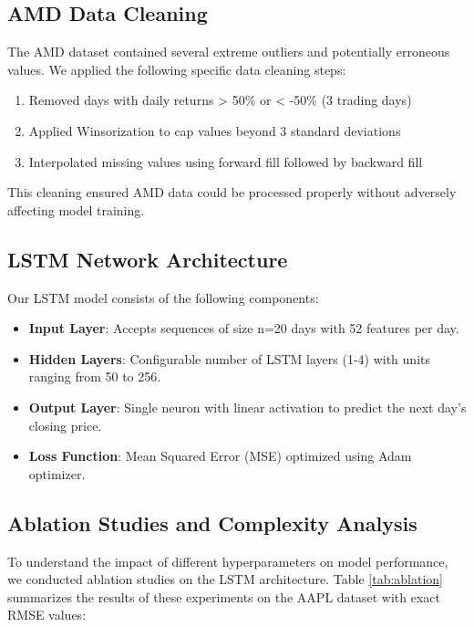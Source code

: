 \documentclass[sigconf]{acmart}
\begin{document}
\subsection{AMD Data Cleaning}

The AMD dataset contained several extreme outliers and potentially erroneous values. We applied the following specific data cleaning steps:

\begin{enumerate}
\item Removed days with daily returns > 50\% or < -50\% (3 trading days)
\item Applied Winsorization to cap values beyond 3 standard deviations
\item Interpolated missing values using forward fill followed by backward fill
\end{enumerate}

This cleaning ensured AMD data could be processed properly without adversely affecting model training.

\subsection{LSTM Network Architecture}

Our LSTM model consists of the following components:
\begin{itemize}
\item \textbf{Input Layer}: Accepts sequences of size n=20 days with 52 features per day.
\item \textbf{Hidden Layers}: Configurable number of LSTM layers (1-4) with units ranging from 50 to 256.
\item \textbf{Output Layer}: Single neuron with linear activation to predict the next day's closing price.
\item \textbf{Loss Function}: Mean Squared Error (MSE) optimized using Adam optimizer.
\end{itemize}

\subsection{Ablation Studies and Complexity Analysis}

To understand the impact of different hyperparameters on model performance, we conducted ablation studies on the LSTM architecture. Table \ref{tab:ablation} summarizes the results of these experiments on the AAPL dataset with exact RMSE values:
\end{document}
